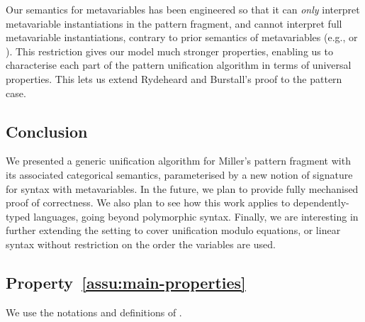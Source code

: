 Our semantics for metavariables has been engineered so that it can
\emph{only} interpret metavariable instantiations in the pattern fragment,
and cannot interpret full metavariable instantiations, contrary to
prior semantics of metavariables (e.g., \citet{DBLP:journals/tocl/HuPS22}
or \citet{DBLP:conf/aplas/Hamana04}). This restriction gives our
model much stronger properties, enabling us to characterise each part
of the pattern unification algorithm in terms of universal properties.
This lets us extend Rydeheard and Burstall's proof to the pattern
case.

\begin{full}

\section{Conclusion}

We presented a generic unification algorithm for Miller's pattern
fragment with its associated categorical semantics, parameterised
by a new notion of signature for syntax with metavariables. In the
future, we plan to provide fully mechanised proof of correctness.
We also plan to see how this work applies to dependently-typed languages,
going beyond polymorphic syntax. Finally, we are interesting in further
extending the setting to cover unification modulo equations, or linear
syntax without restriction on the order the variables are used.

\end{full}




\newpage
\startappendix



\label{app:proof-statements}

\subsection{Property~\ref{assu:main-properties}}

\label{app:proof-L-preserves}

We use the notations and definitions of .

